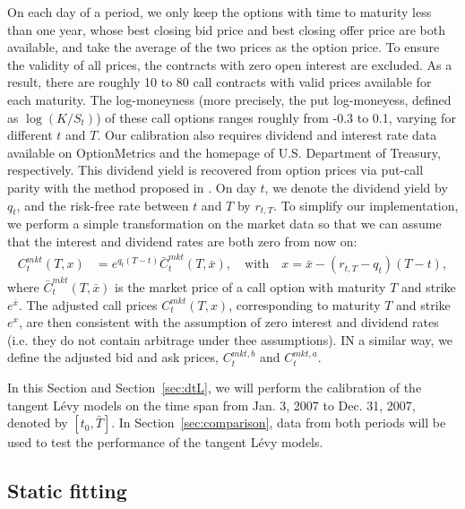 \documentclass{article}
\numberwithin{equation}{section}
\def\bT{\bar{T}}
\begin{document}
On each day of a period, we only keep the options with time to maturity less than one year, whose best closing bid price and best closing offer price are both available, and take the average of the two prices as the option price. To ensure the validity of all prices, the contracts with zero open interest are excluded. As a result, there are roughly 10 to 80 call contracts with valid prices available for each maturity. The log-moneyness (more precisely, the put log-moneyess, defined as $\log(K/S_t)$) of these call options ranges roughly from -0.3 to 0.1, varying for different $t$ and $T$.  Our calibration also requires dividend and interest rate data available on OptionMetrics and the homepage of U.S. Department of Treasury, respectively. This dividend yield is recovered from option prices via put-call parity with the method proposed in \cite{AitSahalia1997nonparametricestimation}. On day $t$, we denote the dividend yield by $q_t$, and the risk-free rate between $t$ and $T$ by $r_{t,T}$.
To simplify our implementation, we perform a simple transformation on the market data so that we can assume that the interest and dividend rates are both zero from now on:
\begin{align} \label{fo:dtl:transform}
C^{mkt}_t(T,x) & = e^{q_t(T-t)} \bar{C}_t^{mkt}(T,\bar{x}), \quad \text{with} \quad x = \bar{x} - (r_{t,T}-q_t)(T-t),
\end{align}
where $\bar{C}_t^{mkt}(T,\bar{x})$ is the market price of a call option with maturity $T$ and strike $e^{\bar{x}}$.
The adjusted call prices $C^{mkt}_t(T,x)$, corresponding to maturity $T$ and strike $e^x$, are then consistent with the assumption of zero interest and dividend rates (i.e. they do not contain arbitrage under thee assumptions). IN a similar way, we define the adjusted bid and ask prices, $C^{mkt,b}_t$ and $C^{mkt,a}_t$.

In this Section and Section~\ref{sec:dtL}, we will perform the calibration of the tangent L\'{e}vy models on the time span from Jan. 3, 2007 to Dec. 31, 2007, denoted by $[t_0,\bT]$. In Section~\ref{sec:comparison}, data from both periods will be used to test the performance of the tangent L\'{e}vy models. 





\subsection{Static fitting}
\label{sec:implementation:static}
\end{document}
